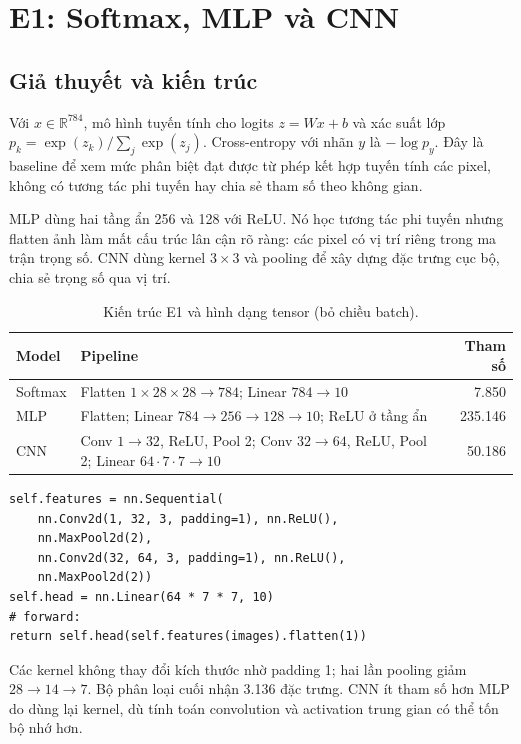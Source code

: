 \documentclass[11pt,a4paper]{article}
\begin{document}
\section{E1: Softmax, MLP và CNN}\label{sec:e1}
\subsection{Giả thuyết và kiến trúc}
Với $x\in\mathbb R^{784}$, mô hình tuyến tính cho logits $z=Wx+b$ và xác suất lớp $p_k=\exp(z_k)/\sum_j\exp(z_j)$. Cross-entropy với nhãn $y$ là $-\log p_y$. Đây là baseline để xem mức phân biệt đạt được từ phép kết hợp tuyến tính các pixel, không có tương tác phi tuyến hay chia sẻ tham số theo không gian.

MLP dùng hai tầng ẩn 256 và 128 với ReLU. Nó học tương tác phi tuyến nhưng flatten ảnh làm mất cấu trúc lân cận rõ ràng: các pixel có vị trí riêng trong ma trận trọng số. CNN dùng kernel $3\times 3$ và pooling để xây dựng đặc trưng cục bộ, chia sẻ trọng số qua vị trí.

\begin{table}[htbp]\centering\small\caption{Kiến trúc E1 và hình dạng tensor (bỏ chiều batch).}
\begin{tabularx}{\linewidth}{lXr}\toprule Model & Pipeline & Tham số\\\midrule
Softmax & Flatten $1\times 28\times 28\to 784$; Linear $784\to 10$ & 7.850\\
MLP & Flatten; Linear $784\to 256\to 128\to 10$; ReLU ở tầng ẩn & 235.146\\
CNN & Conv $1\to 32$, ReLU, Pool 2; Conv $32\to 64$, ReLU, Pool 2; Linear $64\cdot 7\cdot 7\to 10$ & 50.186\\\bottomrule\end{tabularx}\end{table}

\begin{lstlisting}
self.features = nn.Sequential(
    nn.Conv2d(1, 32, 3, padding=1), nn.ReLU(),
    nn.MaxPool2d(2),
    nn.Conv2d(32, 64, 3, padding=1), nn.ReLU(),
    nn.MaxPool2d(2))
self.head = nn.Linear(64 * 7 * 7, 10)
# forward:
return self.head(self.features(images).flatten(1))
\end{lstlisting}

Các kernel không thay đổi kích thước nhờ padding 1; hai lần pooling giảm $28\to 14\to 7$. Bộ phân loại cuối nhận 3.136 đặc trưng. CNN ít tham số hơn MLP do dùng lại kernel, dù tính toán convolution và activation trung gian có thể tốn bộ nhớ hơn.
\clearpage
\end{document}
